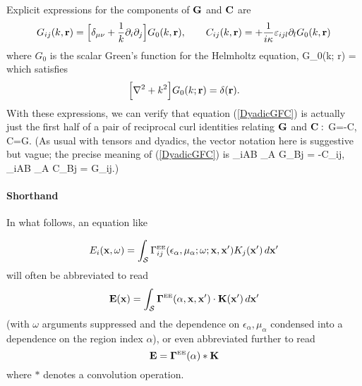\documentclass[dvips,letterpaper]{article}
\begin{document}
Explicit expressions for the components of $\mathbf{G}$ and $\mathbf{C}$ are 
\begin{equation}
G_{ij}(k,\mathbf{r}) =
  \Big[\delta_{\mu\nu} +\frac{1}{k} \partial_i \partial_j \Big]
  G_0(k, \mathbf{r}), \qquad
  C_{ij}(k, \mathbf{r}) = +\frac{1}{i\kappa} \varepsilon_{ijl} 
                          \partial_l G_0(k, \mathbf{r})
\label{GCfromG0}
\end{equation}
where $G_0$ is the scalar Green's function for the Helmholtz equation,
{G_0(k; \vb r)
   =
}
which satisfies
$$ \Big[ \nabla^2 + k^2 \Big] G_0(k; \mathbf{r})
   =\delta(\mathbf{r}).
$$
With these expressions, we can verify that equation (\ref{DyadicGFC}) 
is actually just the first half of a pair of reciprocal curl identities 
relating $\mathbf{G}$ and $\mathbf{C}:$
{
   \nabla \times \vb G=-\vb C, 
\qquad
   \nabla \times \vb C=\vb G.
}
(As usual with tensors and dyadics, the vector notation here
is suggestive but vague; the precise meaning of (\ref{DyadicGFC}) is 
{
    \varepsilon_{iAB} \partial_A G_{Bj} = -C_{ij},
   \qquad
    \varepsilon_{iAB} \partial_A C_{Bj} = G_{ij}.)
}



\paragraph{Shorthand} In what follows, an equation like 

$$ E_i(\mathbf{x}, \omega) = 
   \int_{\mathcal S} 
     \Gamma^{\hbox{\tiny{EE}}}_{ij}(\epsilon_\alpha, \mu_\alpha; \omega; 
                          \mathbf{x}, \mathbf{x}^\prime) 
     K_j(\mathbf{x}^\prime)
    \, d\mathbf{x}^\prime
$$
will often be abbreviated to read 
$$ \mathbf{E}(\mathbf{x}) = 
    \int_{\mathcal S} 
      \boldsymbol{\Gamma}^{\hbox{\tiny{EE}}}(\alpha, \mathbf{x}, \mathbf{x}^\prime) 
         \cdot \mathbf{K}(\mathbf{x}^\prime) 
    \, d\mathbf{x}^\prime
$$
(with $\omega$ arguments suppressed and the dependence 
on $\epsilon_\alpha, \mu_\alpha$ condensed into a dependence
on the region index $\alpha$), or even abbreviated further
to read
$$ \mathbf{E} = \boldsymbol{\Gamma}^{\hbox{\tiny{EE}}}(\alpha) * \mathbf{K} $$
where $*$ denotes a convolution operation.

\newpage
\end{document}
